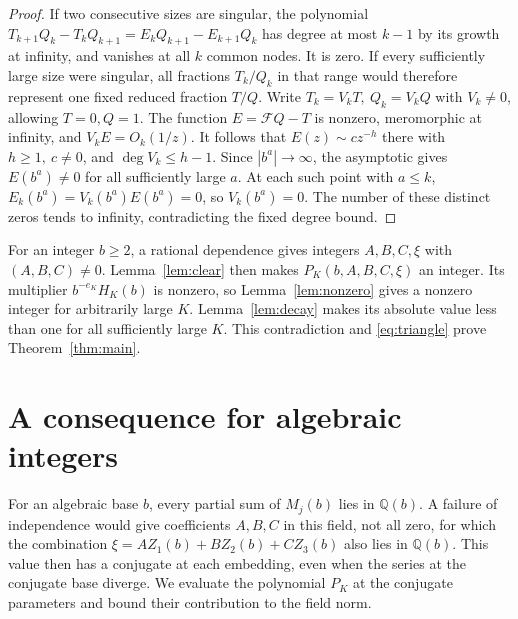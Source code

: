 \documentclass[11pt]{article}
\newcommand{\Q}{\mathbb Q}
\begin{document}
\begin{proof}
If two consecutive sizes are singular, the polynomial
\(T_{k+1}Q_k-T_kQ_{k+1}=E_kQ_{k+1}-E_{k+1}Q_k\) has degree at
most \(k-1\) by its growth at infinity, and vanishes at all \(k\)
common nodes. It is zero. If every sufficiently large size were
singular, all fractions \(T_k/Q_k\) in that range would therefore
represent one fixed reduced fraction \(T/Q\). Write
\(T_k=V_kT,\ Q_k=V_kQ\) with \(V_k\ne0\), allowing \(T=0,Q=1\).
The function \(E=\mathcal F Q-T\) is nonzero, meromorphic at infinity,
and \(V_k E=O_k(1/z)\). It follows that \(E(z)\sim c z^{-h}\) there
with \(h\ge1,\ c\ne0\), and \(\deg V_k\le h-1\).
Since \(|b^a|\to\infty\), the asymptotic gives \(E(b^a)\ne0\) for
all sufficiently large \(a\). At each such point with \(a\le k\),
\(E_k(b^a)=V_k(b^a)E(b^a)=0\), so \(V_k(b^a)=0\). The number of
these distinct zeros tends to infinity, contradicting the fixed
degree bound.
\end{proof}

For an integer \(b\ge2\), a rational dependence gives integers
\(A,B,C,\xi\) with \((A,B,C)\ne0\). Lemma~\ref{lem:clear} then
makes \(P_K(b,A,B,C,\xi)\) an integer. Its multiplier
\(b^{-e_K}H_K(b)\) is nonzero, so Lemma~\ref{lem:nonzero} gives a
nonzero integer for arbitrarily large \(K\). Lemma~\ref{lem:decay}
makes its absolute value less than one for all sufficiently large \(K\).
This contradiction and \eqref{eq:triangle} prove Theorem~\ref{thm:main}.

\section{A consequence for algebraic integers}

For an algebraic base \(b\), every partial sum of \(M_j(b)\) lies
in \(\Q(b)\). A failure of independence would give coefficients
\(A,B,C\) in this field, not all zero, for which the combination
\(\xi=AZ_1(b)+BZ_2(b)+CZ_3(b)\) also lies in \(\Q(b)\). This value
then has a conjugate at each embedding, even when the series at the
conjugate base diverge. We evaluate the polynomial \(P_K\) at the
conjugate parameters and bound their contribution to the field norm.
\end{document}
